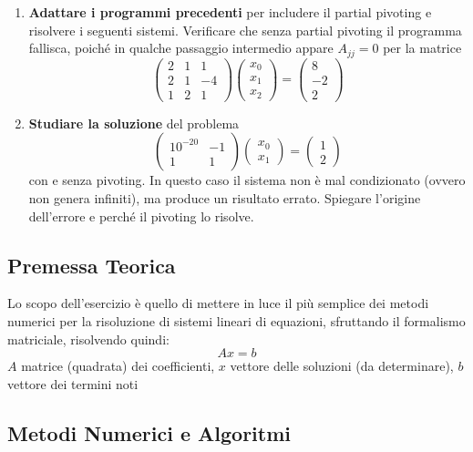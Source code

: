 \begin{enumerate}
    \item \textbf{Adattare i programmi precedenti} per includere il partial pivoting e risolvere i seguenti sistemi. Verificare che senza partial pivoting il programma fallisca, poiché in qualche passaggio intermedio appare $A_{jj} = 0$ per la matrice
    \[
        \begin{pmatrix} 2 & 1 & 1 \\ 2 & 1 & -4 \\ 1 & 2 & 1 \end{pmatrix} \begin{pmatrix} x_0 \\ x_1 \\ x_2 \end{pmatrix} = \begin{pmatrix} 8 \\ -2 \\ 2 \end{pmatrix}
    \]

    \item \textbf{Studiare la soluzione} del problema
    \[
        \begin{pmatrix} 10^{-20} & -1 \\ 1 & 1 \end{pmatrix} \begin{pmatrix} x_0 \\ x_1 \end{pmatrix} = \begin{pmatrix} 1 \\ 2 \end{pmatrix}
    \]
    con e senza pivoting. In questo caso il sistema non è mal condizionato (ovvero non genera infiniti), ma produce un risultato errato. Spiegare l'origine dell'errore e perché il pivoting lo risolve.
\end{enumerate}

\subsection{Premessa Teorica}
Lo scopo dell'esercizio è quello di mettere in luce il più semplice dei metodi numerici per la risoluzione di sistemi lineari di equazioni, sfruttando il formalismo matriciale, risolvendo quindi:
$$
Ax=b
$$
$A$ matrice (quadrata) dei coefficienti, $x$ vettore delle soluzioni (da determinare), $b$ vettore dei termini noti
\subsection{Metodi Numerici e Algoritmi}
